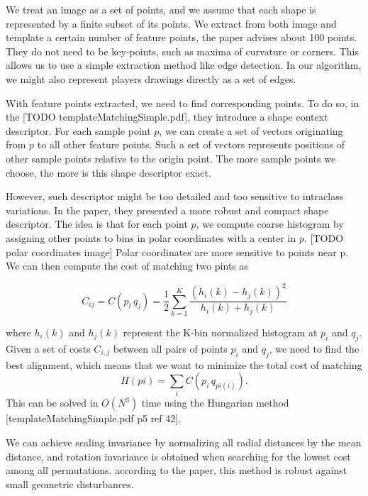 We treat an image as a set of points, and we assume that each shape is represented by a finite subset of its points. We extract from both image and template a certain number of feature points, the paper advises about 100 points. They do not need to be key-points, such as maxima of curvature or corners. This allows us to use a simple extraction method like edge detection. In our algorithm, we might also represent players drawings directly as a set of edges. 

With feature points extracted, we need to find corresponding points. To do so, in the [TODO templateMatchingSimple.pdf], they introduce a shape context descriptor. For each sample point $p$, we can create a set of vectors originating from $p$ to all other feature points. Such a set of vectors represents positions of other sample points relative to the origin point. The more sample points we choose, the more is this shape descriptor exact.

However, such descriptor might be too detailed and too sensitive to intraclass variations. In the paper, they presented a more robust and compact shape descriptor. The idea is that for each point $p$, we compute coarse histogram by assigning other points to bins in polar coordinates with a center in $p$. [TODO polar coordinates image] Polar coordinates are more sensitive to points near p. We can then compute the cost of matching two pints as 

\begin{equation*}
C_{ij} =  C(p_{i}\,q_{j}) = \frac{1}{2} \sum_{k=1}^{K} \frac{(h_{i}(k) - h_{j}(k))^2}{h_{i}(k) + h_{j}(k)}
\end{equation*}

where $ h_{i}(k) $ and $ h_{j}(k) $ represent the K-bin normalized histogram at $p_{i}$ and $q_{j}$. Given a set of costs $C_{i,j}$ between all pairs of points $p_{i}$ and $q_{j}$, we need to find the best alignment, which means that we want to minimize the total cost of matching 
\begin{equation*}
H(pi) = \sum_{i} C(p_{i}\,q_{pi(i)}).
\end{equation*}
This can be solved in $O(N^3)$ time using the Hungarian method [templateMatchingSimple.pdf p5 ref 42]. 

We can achieve scaling invariance by normalizing all radial distances by the mean distance, and rotation invariance is obtained when searching for the lowest cost among all permutations. according to the paper, this method is robust against small geometric disturbances.

